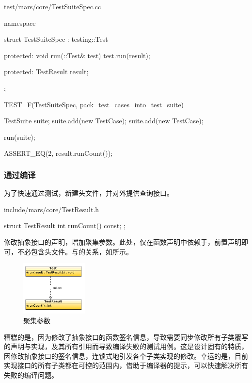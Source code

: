 \begin{content}
\begin{nodiff}{test/mars/core/TestSuiteSpec.cc}
\begin{c++}
namespace {
  struct TestSuiteSpec : testing::Test {
  protected:
    void run(::Test& test) {
      test.run(result);
    }

  protected:
    TestResult result;
  };
}

TEST_F(TestSuiteSpec, pack_test_cases_into_test_suite) {
  TestSuite suite;
  suite.add(new TestCase);
  suite.add(new TestCase);

  run(suite);

  ASSERT_EQ(2, result.runCount());
}
 \end{c++}
\end{nodiff}

\subsubsection{通过编译}

为了快速通过测试，新建头文件，并对外提供查询接口。

\begin{nodiff}{include/mars/core/TestResult.h}
 \begin{c++}
struct TestResult {
  int runCount() const;
};
 \end{c++}
\end{nodiff}

修改抽象接口的声明，增加聚集参数。此处，仅在函数声明中依赖于，前置声明即可，不必包含头文件。与的关系，如所示。

\begin{figure}
\centering
\includegraphics[width=0.3\textwidth]{figures/xunit/test-result.png}
\caption{聚集参数}
 \label{fig:test-result}
\end{figure}

糟糕的是，因为修改了抽象接口的函数签名信息，导致需要同步修改所有子类覆写的声明与实现，及其所有引用而导致编译失败的测试用例。这是设计固有的特质，因修改抽象接口的签名信息，连锁式地引发各个子类实现的修改。幸运的是，目前实现接口的所有子类都在可控的范围内，借助于编译器的提示，可以快速解决所有失败的编译问题。


\end{content}
